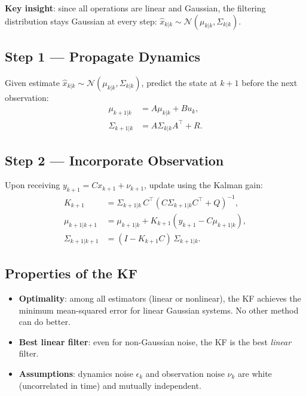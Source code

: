 \documentclass[12pt, a4paper]{article}
\begin{document}
\textbf{Key insight}: since all operations are linear and Gaussian, the
filtering distribution stays Gaussian at every step:
$\hat{x}_{k|k}\sim\mathcal{N}(\mu_{k|k},\Sigma_{k|k})$.

\subsection{Step 1 --- Propagate Dynamics}

Given estimate $\hat{x}_{k|k}\sim\mathcal{N}(\mu_{k|k},\Sigma_{k|k})$,
predict the state at $k+1$ before the next observation:
\begin{align}
  \mu_{k+1|k} &= A\mu_{k|k} + Bu_k, \label{eq:KF_prop_mu}\\
  \Sigma_{k+1|k} &= A\Sigma_{k|k}A^\top + R. \label{eq:KF_prop_Sigma}
\end{align}

\subsection{Step 2 --- Incorporate Observation}

Upon receiving $y_{k+1}=Cx_{k+1}+\nu_{k+1}$, update using the Kalman
gain:
\begin{align}
  K_{k+1} &= \Sigma_{k+1|k}\,C^\top\!\left(C\Sigma_{k+1|k}C^\top+Q\right)^{-1},
  \label{eq:KF_gain}\\
  \mu_{k+1|k+1} &= \mu_{k+1|k} + K_{k+1}(y_{k+1}-C\mu_{k+1|k}),
  \label{eq:KF_update_mu}\\
  \Sigma_{k+1|k+1} &= (I-K_{k+1}C)\,\Sigma_{k+1|k}.
  \label{eq:KF_update_Sigma}
\end{align}

\subsection{Properties of the KF}

\begin{itemize}
  \item \textbf{Optimality}: among all estimators (linear or nonlinear),
    the KF achieves the minimum mean-squared error for linear Gaussian
    systems. No other method can do better.
  \item \textbf{Best linear filter}: even for non-Gaussian noise, the KF
    is the best \emph{linear} filter.
  \item \textbf{Assumptions}: dynamics noise $\epsilon_k$ and observation
    noise $\nu_k$ are white (uncorrelated in time) and mutually
    independent.
\end{itemize}
\end{document}

